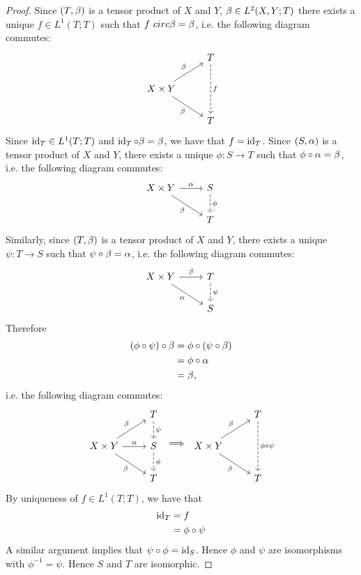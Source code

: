 \documentclass{book}
\begin{document}
\begin{proof}
	Since $(T, \beta)$ is a tensor product of $X$ and $Y$, $\beta \in L^2(X,Y; T)$ there exists a unique $f \in L^1(T;T)$ such that $f\ circ \beta = \beta$, i.e. the following diagram commutes: 
	\[ 
	\begin{tikzcd}
		& T \arrow[dd, dashed, "f"] \\
		X \times Y \arrow[ur, "\be"] \arrow[dr, "\be"'] 
		&   \\
		& T 
	\end{tikzcd}
	\] 
	Since $\operatorname{id}_T \in L^1(T;T)$ and $\operatorname{id}_T \circ \beta = \beta$, we have that $f = \operatorname{id}_T$. Since $(S, \alpha)$ is a tensor product of $X$ and $Y$, there exists a unique $\phi: S \rightarrow T$ such that $\phi \circ \alpha = \beta$, i.e. the following diagram commutes: 
	\[ 
	\begin{tikzcd}
		X \times Y \arrow[r, "\al"] \arrow[dr, "\be"'] 	
		& S  \arrow[d, dashed, "\phi"] \\
		& T 
	\end{tikzcd}
	\] 
	Similarly, since $(T, \beta)$ is a tensor product of $X$ and $Y$, there exists a unique $\psi: T \rightarrow S$ such that $\psi \circ \beta = \alpha$, i.e. the following diagram commutes: 
	\[ 
	\begin{tikzcd}
		X \times Y \arrow[r, "\be"] \arrow[dr, "\al"'] 	
		& T  \arrow[d, dashed, "\psi"] \\
		& S 
	\end{tikzcd}
	\] 
	Therefore 
	\begin{align*}
		(\phi \circ \psi) \circ \beta 
		& = \phi \circ (\psi \circ \beta) \\
		& = \phi \circ \alpha \\
		& = \beta, 
	\end{align*}
	i.e. the following diagram commutes:
	\[ 
	\begin{tikzcd}
		& T \arrow[d, dashed, "\psi"] \\
		X \times Y \arrow[ur, "\be"] \arrow[dr, "\be"'] \arrow[r, "\al"]	
		& S  \arrow[d, dashed, "\phi"] \\
		& T 
	\end{tikzcd}
	\implies
	\begin{tikzcd}
		& T \arrow[dd, dashed, "\phi \circ \psi"] \\
		X \times Y \arrow[ur, "\be"] \arrow[dr, "\be"'] 
		&  \\
		& T 
	\end{tikzcd}
	\] 
	By uniqueness of $f \in L^1(T;T)$, we have that 
	\begin{align*}
		\operatorname{id}_T
		& = f \\
		& = \phi \circ \psi 
	\end{align*}
	A similar argument implies that $\psi \circ \phi = \operatorname{id}_S$. Hence $\phi$ and $\psi$ are isomorphisms with $\phi^{-1} = \psi$. Hence $S$ and $T$ are isomorphic.
\end{proof}
\end{document}
